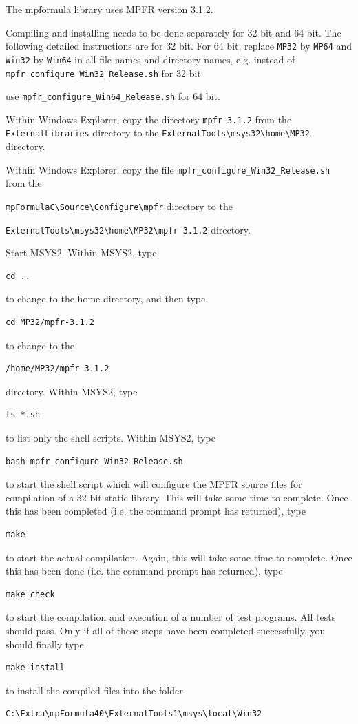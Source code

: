 The mpformula library uses MPFR version 3.1.2.


\vpara
Compiling and installing needs to be done separately for 32 bit and 64 bit. The following detailed instructions are for 32 bit. For 64 bit, replace \verb|MP32| by \verb|MP64| and \verb|Win32| by  \verb|Win64| in all file names and directory names, e.g. instead of \verb|mpfr_configure_Win32_Release.sh| for 32 bit

use \verb|mpfr_configure_Win64_Release.sh| for 64 bit.

\vpara
Within Windows Explorer, copy the directory \verb|mpfr-3.1.2|  from the \verb|ExternalLibraries|
directory to the \verb|ExternalTools\msys32\home\MP32| directory. 

\vpara
Within Windows Explorer, copy the file \verb|mpfr_configure_Win32_Release.sh|  from the

\verb|mpFormulaC\Source\Configure\mpfr| directory to the 

\verb|ExternalTools\msys32\home\MP32\mpfr-3.1.2| directory.  


\vpara
Start MSYS2. Within MSYS2, type
\begin{verbatim}
cd ..
\end{verbatim}
to change to the home directory, and then type 
\begin{verbatim}
cd MP32/mpfr-3.1.2
\end{verbatim}
to change to the
\begin{verbatim}
/home/MP32/mpfr-3.1.2
\end{verbatim}
directory. Within MSYS2, type
\begin{verbatim}
ls *.sh
\end{verbatim}
to list only the shell scripts. Within MSYS2, type
\begin{verbatim}
bash mpfr_configure_Win32_Release.sh
\end{verbatim}
to start the shell script which will configure the MPFR source files for compilation of a 32 bit static library. This will take some time to complete. Once this has been completed (i.e. the command prompt has returned), type
\begin{verbatim}
make
\end{verbatim}
to start the actual compilation. Again, this will take some time to complete. Once this has been done (i.e. the command prompt has returned), type
\begin{verbatim}
make check
\end{verbatim}
to start the compilation and execution of a number of test programs. All tests should pass. Only if all of these steps have been completed successfully, you should finally type
\begin{verbatim}
make install
\end{verbatim}
to install the compiled files into the folder
\begin{verbatim}
C:\Extra\mpFormula40\ExternalTools1\msys\local\Win32
\end{verbatim}



